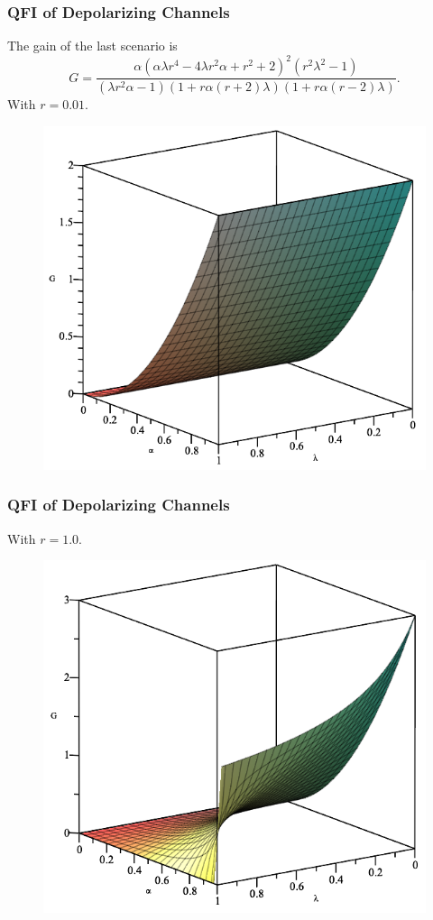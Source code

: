 \documentclass{beamer}
\begin{document}
\begin{frame}
\frametitle{QFI of Depolarizing Channels}
The gain of the last scenario is
\begin{equation}\label{eq:50}
G=\frac{\alpha(\alpha\lambda r^4-4\lambda r^2\alpha+r^2+2)^2(r^2\lambda^2-1)}{(\lambda r^2\alpha-1)(1+r\alpha(r+2)\lambda)(1+r\alpha(r-2)\lambda)}.
\end{equation}
With $r=0.01$.
\begin{figure}
\begin{center}
\includegraphics[width=0.60\linewidth]{Depolarizing-Double-Channel-Alpha-and-Lambda-r=001-Gain-Graph.png}
\end{center}
\end{figure}
\end{frame}
\begin{frame}
\frametitle{QFI of Depolarizing Channels}
With $r=1.0$.
\begin{figure}
\begin{center}
\includegraphics[width=0.75\linewidth]{Depolarizing-Double-Channel-Alpha-and-Lambda-r=1-Gain-Graph.png}
\end{center}
\end{figure}
\end{frame}
\end{document}
